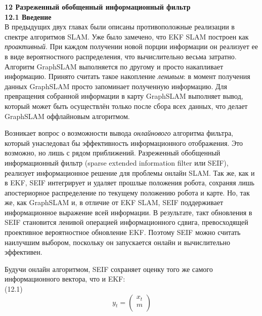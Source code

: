 \documentclass[10pt,a4paper]{article}
\begin{document}
\textbf{12 Разреженный обобщенный информационный фильтр}\\

\textbf{12.1	Введение}\\

В предыдущих двух главах были описаны противоположные реализации в спектре алгоритмов SLAM. Уже было замечено, что EKF SLAM построен как \textit{проактивный}. При каждом получении новой порции информации он реализует ее в виде вероятностного распределения, что вычислительно весьма затратно. Алгоритм GraphSLAM выполняется по другому и просто накапливает информацию. Принято считать такое накопление \textit{ленивым}: в момент получения данных GraphSLAM просто запоминает полученную информацию. Для превращения собранной информации в карту GraphSLAM выполняет вывод, который может быть осуществлён только после сбора всех данных, что делает GraphSLAM оффлайновым алгоритмом.

Возникает вопрос о возможности вывода \textit{онлайнового} алгоритма фильтра, который унаследовал бы эффективность информационного отображения. Это возможно, но лишь с рядом приближений. Разреженный обобщенный информационный фильтр (sparse extended information filter или SEIF), реализует информационное решение для проблемы онлайн SLAM. Так же, как и в EKF, SEIF интегрирует и удаляет прошлые положения робота, сохраняя лишь апостериорное распределение по текущему положению робота и карте. Но, так же, как GraphSLAM и, в отличие от EKF SLAM, SEIF поддерживает информационное выражение всей информации. В результате, такт обновления в SEIF становится ленивой операцией информационного сдвига, превосходящей проективное вероятностное обновление EKF. Поэтому SEIF можно считать наилучшим выбором, поскольку он запускается онлайн и вычислительно эффективен. 

Будучи онлайн алгоритмом, SEIF сохраняет оценку того же самого информационного вектора, что и EKF:\\

(12.1)
$$y_t=\left(\begin{array}{c}x_t\\m\\
\end{array} \right)$$
\end{document}
